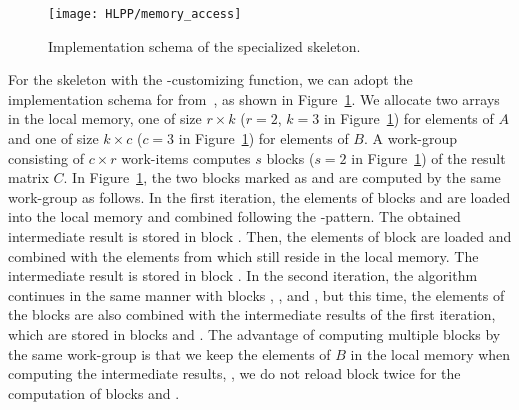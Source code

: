 \begin{figure}[b]
  \centering
  \texttt{[image: HLPP/memory\_access]}
  \caption{Implementation schema of the specialized \allpairs skeleton.}
  \label{fig:memory_access}
\end{figure}
For the \allpairs skeleton with the \zip-\reduce customizing function, we can adopt the implementation schema for \GPUs from~\cite{SarjeAl2013}, as shown in Figure~\ref{fig:memory_access}.
We allocate two arrays in the local memory, one of size $r\times k$ ($r=2$, $k=3$ in Figure~\ref{fig:memory_access}) for elements of $A$ and one of size $k\times c$ ($c=3$ in Figure~\ref{fig:memory_access}) for elements of $B$.
A work-group consisting of $c\times r$ work-items computes $s$ blocks ($s=2$ in Figure~\ref{fig:memory_access}) of the result matrix $C$.
In Figure~\ref{fig:memory_access}, the two blocks marked as  and  are computed by the same work-group as follows.
In the first iteration, the elements of blocks  and  are loaded into the local memory and combined following the \zip-\reduce pattern.
The obtained intermediate result is stored in block .
Then, the elements of block  are loaded and combined with the elements from  which still reside in the local memory.
The intermediate result is stored in block .
In the second iteration, the algorithm continues in the same manner with blocks , , and , but this time, the elements of the blocks are also combined with the intermediate results of the first iteration, which are stored in blocks  and .
The advantage of computing multiple blocks by the same work-group is that we keep the elements of $B$ in the local memory when computing the intermediate results, \ie, we do not reload block  twice for the computation of blocks  and .

